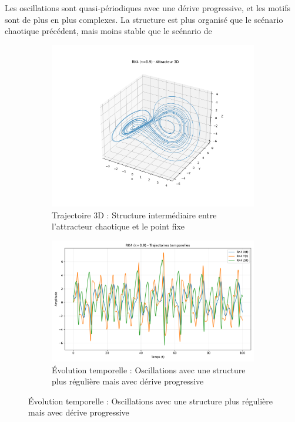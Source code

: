 Les oscillations sont quasi-périodiques avec une dérive progressive, et les motifs sont de plus en plus complexes. La structure est plus organisé que le scénario chaotique précédent, mais moins stable que le scénario de 
\begin{figure}[H]
    \centering
    \begin{subfigure}[b]{0.5\textwidth}
        \includegraphics[width=\textwidth]{figures/rk4/rk4_tau8.9_3d}
        \caption{Trajectoire 3D : Structure intermédiaire entre l'attracteur chaotique et le point fixe}
    \end{subfigure}
    \begin{subfigure}[b]{0.4\textwidth}
        \includegraphics[width=\textwidth]{figures/rk4/rk4_tau8.9_time}
        \caption{Évolution temporelle : Oscillations avec une structure plus régulière mais avec dérive progressive}

\end{subfigure}
\end{figure}
